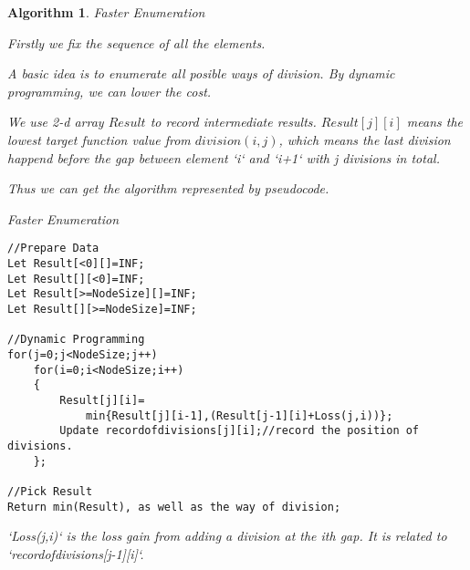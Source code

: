 \documentclass{article} %
\newtheorem{algorithm_}{Algorithm}
\begin{document}
\begin{algorithm_}
	
Faster Enumeration

Firstly we fix the sequence of all the elements.

A basic idea is to enumerate all posible ways of division. By dynamic programming, we can lower the cost.

We use 2-d array $Result$ to record intermediate results. $Result[j][i]$ means the lowest target function value from $division(i,j)$, which means the last division happend before the gap between element `i` and `i+1` with j divisions in total.

Thus we can get the algorithm represented by pseudocode.

\begin{algorithm}
	\caption{Faster Enumeration}         %
	\label{alg1}                          %
		

\begin{verbatim}
//Prepare Data
Let Result[<0][]=INF;
Let Result[][<0]=INF;
Let Result[>=NodeSize][]=INF;
Let Result[][>=NodeSize]=INF;

//Dynamic Programming
for(j=0;j<NodeSize;j++)
    for(i=0;i<NodeSize;i++)
    {
        Result[j][i]=
            min{Result[j][i-1],(Result[j-1][i]+Loss(j,i))}; 
        Update recordofdivisions[j][i];//record the position of divisions.  
    };

//Pick Result
Return min(Result), as well as the way of division;

\end{verbatim}
\end{algorithm}

`Loss(j,i)` is the loss gain from adding a division at the ith gap. It is related to `recordofdivisions[j-1][i]`.

\end{algorithm_}
\end{document}
